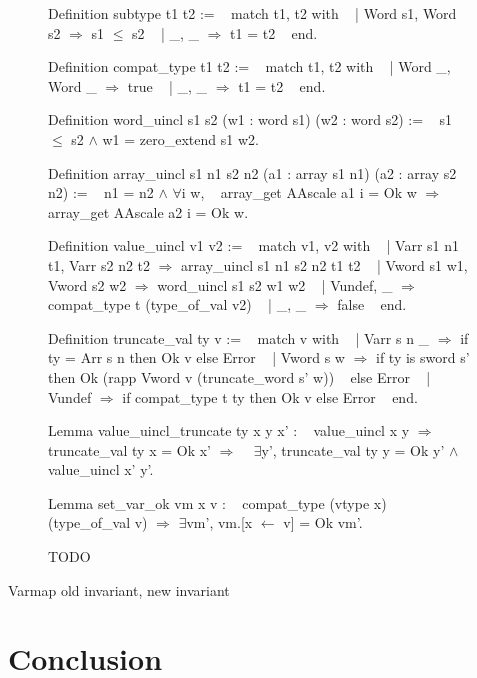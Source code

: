 \documentclass{article}
\begin{document}
\begin{figure}[t]
\obeylines\obeyspaces\ttfamily%
Definition subtype t1 t2 :=
~ match t1, t2 with
~ | Word s1, Word s2 \(\Rightarrow\) s1 \(\leq\) s2
~ | \_,       \_       \(\Rightarrow\) t1 = t2
~ end.

Definition compat\_type t1 t2 :=
~ match t1, t2 with
~ | Word \_, Word \_ \(\Rightarrow\) true
~ | \_,      \_      \(\Rightarrow\) t1 = t2
~ end.

Definition word\_uincl s1 s2 (w1 : word s1) (w2 : word s2) :=
~ s1 \(\leq\) s2 \(\wedge\) w1 = zero\_extend s1 w2.

Definition array\_uincl s1 n1 s2 n2 (a1 : array s1 n1) (a2 : array s2 n2) :=
~ n1 = n2 \(\wedge\) \(\forall\)i w,
~   array\_get AAscale a1 i = Ok w \(\Longrightarrow\) array\_get AAscale a2 i = Ok w.

Definition value\_uincl v1 v2 :=
~ match v1, v2 with
~ | Varr s1 n1 t1, Varr s2 n2 t2 \(\Rightarrow\) array\_uincl s1 n1 s2 n2 t1 t2
~ | Vword s1 w1,   Vword s2 w2   \(\Rightarrow\) word\_uincl s1 s2 w1 w2
~ | Vundef,        \_             \(\Rightarrow\) compat\_type t (type\_of\_val v2)
~ | \_,             \_             \(\Rightarrow\) false
~ end.

Definition truncate\_val ty v :=
~ match v with
~ | Varr s n \_ \(\Rightarrow\) if ty = Arr s n     then Ok v else Error
~ | Vword s  w \(\Rightarrow\) if ty is sword s'   then Ok (rapp Vword v (truncate\_word s' w))
~   else Error
~ | Vundef     \(\Rightarrow\) if compat\_type t ty then Ok v else Error
~ end.

Lemma value\_uincl\_truncate ty x y x' :
~ value\_uincl x y \(\Longrightarrow\) truncate\_val ty x = Ok x' \(\Longrightarrow\)
~ \(\exists\)y', truncate\_val ty y = Ok y' \(\wedge\) value\_uincl x' y'.

Lemma set\_var\_ok vm x v :
~ compat\_type (vtype x) (type\_of\_val v) \(\Longrightarrow\) \(\exists\)vm', vm.[x \(\leftarrow\) v] = Ok vm'.
\normalfont%
\caption{TODO}
\end{figure}

Varmap old invariant, new invariant


\section{Conclusion}\label{sec:ccl}
\end{document}
